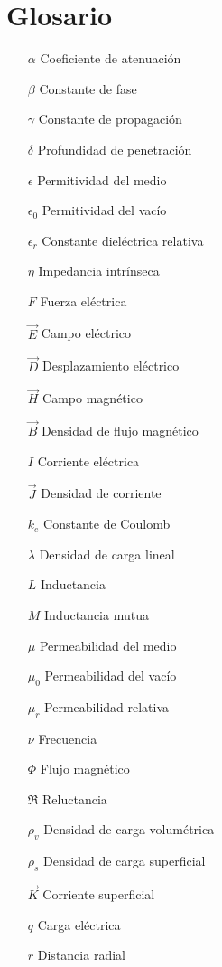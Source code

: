 \documentclass[10pt,conference]{IEEEtran}
\numberwithin{table}{section}
\begin{document}
\section{Glosario}
\begin{itemize}[leftmargin=1.5cm]
    \item[$\alpha$] Coeficiente de atenuación
    \item[$\beta$] Constante de fase
    \item[$\gamma$] Constante de propagación
    \item[$\delta$] Profundidad de penetración
    \item[$\epsilon$] Permitividad del medio
    \item[$\epsilon_0$] Permitividad del vacío
    \item[$\epsilon_r$] Constante dieléctrica relativa
    \item[$\eta$] Impedancia intrínseca
    \item[$F$] Fuerza eléctrica
    \item[$\vec{E}$] Campo eléctrico
    \item[$\vec{D}$] Desplazamiento eléctrico
    \item[$\vec{H}$] Campo magnético
    \item[$\vec{B}$] Densidad de flujo magnético
    \item[$I$] Corriente eléctrica
    \item[$\vec{J}$] Densidad de corriente
    \item[$k_e$] Constante de Coulomb
    \item[$\lambda$] Densidad de carga lineal
    \item[$L$] Inductancia
    \item[$M$] Inductancia mutua
    \item[$\mu$] Permeabilidad del medio
    \item[$\mu_0$] Permeabilidad del vacío
    \item[$\mu_r$] Permeabilidad relativa
    \item[$\nu$] Frecuencia
    \item[$\Phi$] Flujo magnético
    \item[$\Re$] Reluctancia
    \item[$\rho_v$] Densidad de carga volumétrica
    \item[$\rho_s$] Densidad de carga superficial
    \item[$\vec{K}$] Corriente superficial
    \item[$q$] Carga eléctrica
    \item[$r$] Distancia radial

\end{itemize}
\end{document}
